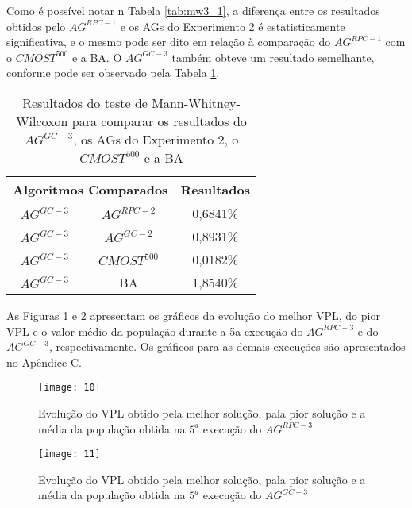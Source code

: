 Como é possível notar n Tabela \ref{tab:mw3_1}, a diferença entre os resultados obtidos pelo $AG^{RPC-1}$ e os AGs do Experimento 2 é estatisticamente significativa, e o mesmo pode ser dito em relação à comparação do $AG^{RPC-1}$ com o $CMOST^{500}$ e a BA. O $AG^{GC-3}$ também obteve um resultado semelhante, conforme pode ser observado pela Tabela \ref{tab:mw3_2}.

\begin{table}[H]
\centering
\caption{Resultados do teste de Mann-Whitney-Wilcoxon para comparar os resultados do $AG^{GC-3}$, os AGs do Experimento 2, o $CMOST^{500}$ e a BA}
\label{tab:mw3_2}
\begin{tabular}{|c|c|c|}
\hline
\multicolumn{2}{|c|}{Algoritmos Comparados} & Resultados \\ \hline
$AG^{GC-3}$ & $AG^{RPC-2}$ & 0,6841\% \\ \hline
$AG^{GC-3}$ & $AG^{GC-2}$ & 0,8931\% \\ \hline
$AG^{GC-3}$ & $CMOST^{500}$ & 0,0182\% \\ \hline
$AG^{GC-3}$ & BA & 1,8540\% \\ \hline

\end{tabular}
\end{table}

As Figuras \ref{fig:graph3_1} e \ref{fig:graph3_2} apresentam os gráficos da evolução do melhor VPL, do pior VPL e o valor médio da população durante a 5a execução do $AG^{RPC-3}$ e do $AG^{GC-3}$, respectivamente. Os gráficos para as demais execuções são apresentados no Apêndice C. 

\begin{figure}[H]
\centering
\texttt{[image: 10]}
\caption{ Evolução do VPL obtido pela melhor solução, pala pior solução e a média da população obtida na $5^a$ execução do $AG^{RPC-3}$}
\label{fig:graph3_1}
\end{figure}

\begin{figure}[H]
\centering
\texttt{[image: 11]}
\caption{Evolução do VPL obtido pela melhor solução, pala pior solução e a média da população obtida na $5^a$ execução do $AG^{GC-3}$}
\label{fig:graph3_2}
\end{figure}

